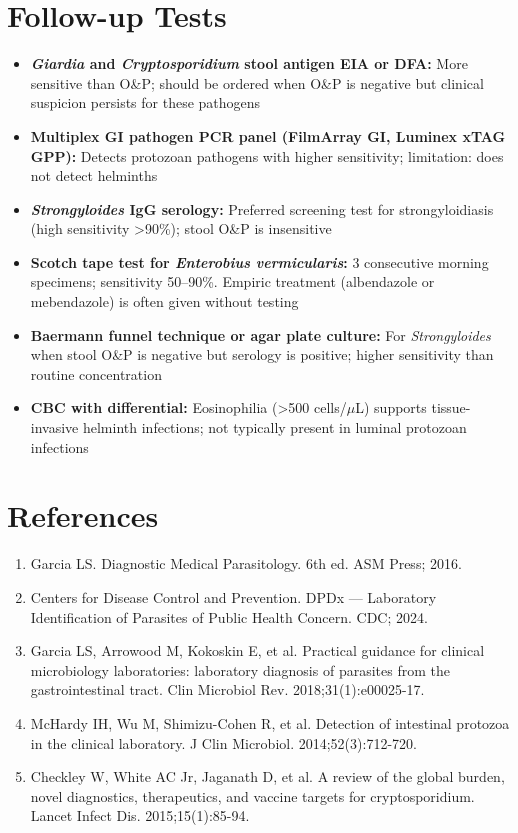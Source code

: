 \section*{Follow-up Tests}
\begin{itemize}
  \item \textbf{\textit{Giardia} and \textit{Cryptosporidium} stool antigen EIA or DFA:} More sensitive than O\&P; should be ordered when O\&P is negative but clinical suspicion persists for these pathogens
  \item \textbf{Multiplex GI pathogen PCR panel (FilmArray GI, Luminex xTAG GPP):} Detects protozoan pathogens with higher sensitivity; limitation: does not detect helminths
  \item \textbf{\textit{Strongyloides} IgG serology:} Preferred screening test for strongyloidiasis (high sensitivity >90\%); stool O\&P is insensitive
  \item \textbf{Scotch tape test for \textit{Enterobius vermicularis}:} 3 consecutive morning specimens; sensitivity 50--90\%. Empiric treatment (albendazole or mebendazole) is often given without testing
  \item \textbf{Baermann funnel technique or agar plate culture:} For \textit{Strongyloides} when stool O\&P is negative but serology is positive; higher sensitivity than routine concentration
  \item \textbf{CBC with differential:} Eosinophilia (>500 cells/$\mu$L) supports tissue-invasive helminth infections; not typically present in luminal protozoan infections
\end{itemize}

\section*{References}
\begin{enumerate}
  \item Garcia LS. Diagnostic Medical Parasitology. 6th ed. ASM Press; 2016.
  \item Centers for Disease Control and Prevention. DPDx --- Laboratory Identification of Parasites of Public Health Concern. CDC; 2024.
  \item Garcia LS, Arrowood M, Kokoskin E, et al. Practical guidance for clinical microbiology laboratories: laboratory diagnosis of parasites from the gastrointestinal tract. Clin Microbiol Rev. 2018;31(1):e00025-17.
  \item McHardy IH, Wu M, Shimizu-Cohen R, et al. Detection of intestinal protozoa in the clinical laboratory. J Clin Microbiol. 2014;52(3):712-720.
  \item Checkley W, White AC Jr, Jaganath D, et al. A review of the global burden, novel diagnostics, therapeutics, and vaccine targets for cryptosporidium. Lancet Infect Dis. 2015;15(1):85-94.
\end{enumerate}

\clearpage

